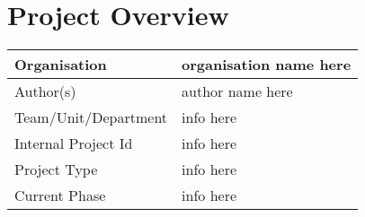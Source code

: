 \documentclass[qipps.tex]{subfiles}
\begin{document}
\section{Project Overview}

\begin{tabu} to 170mm {|X[1.5,l]|X[3,r]|} \hline
Organisation & organisation name here \\ \hline
Author(s) & author name here \\ \hline
Team/Unit/Department & info here \\ \hline
Internal Project Id & info here \\ \hline
Project Type & info here \\ \hline
Current Phase & info here \\ \hline
\end{tabu}
\end{document}
